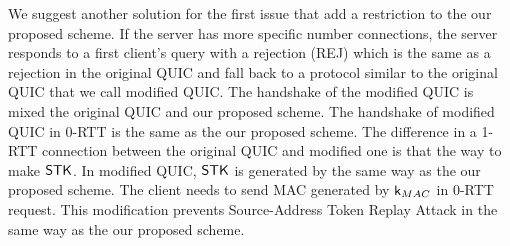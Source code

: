 We suggest another solution for the first issue that add a restriction to the our
proposed scheme.
If the server has more specific number connections, the server
responds to a first client's query with a rejection (REJ) which
is the same as a rejection in the original QUIC and
fall back to a protocol similar to the original QUIC that we call
modified QUIC.
The handshake of the modified QUIC is mixed the original QUIC and our
proposed scheme.
The handshake of modified QUIC in 0-RTT is the same as the our proposed
scheme.
The difference in a 1-RTT connection between the original QUIC and modified one
is that the way to make $\mathsf{STK}$. In modified QUIC, $\mathsf{STK}$ is generated
by the same way as the our proposed scheme. The client needs to send
MAC generated by $\mathsf{k}_{MAC}$ in 0-RTT request.
This modification prevents Source-Address Token Replay Attack
in the same way as the our proposed scheme.